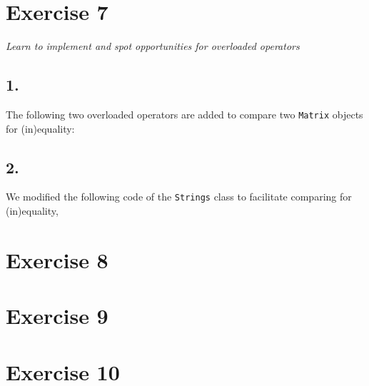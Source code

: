\documentclass[12pt]{article}
\newcommand{\desc}[1]{\textit{#1} \vspace{1em}}
\begin{document}
\clearpage
\section*{Exercise 7}
\desc{Learn to implement and spot opportunities for overloaded operators}
\subsection*{1.}
The following two overloaded operators are added to compare two \texttt{Matrix} objects for (in)equality:


\subsection*{2.}
We modified the following code of the \texttt{Strings} class to facilitate comparing for (in)equality,




\clearpage
\section*{Exercise 8}
\desc{}

\clearpage
\section*{Exercise 9}
\desc{}

\clearpage
\section*{Exercise 10}
\desc{}

\clearpage
\end{document}

